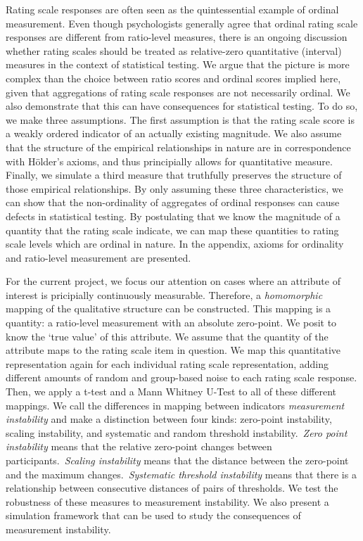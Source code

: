 \documentclass[utf8]{FrontiersinVancouver}
\begin{document}
Rating scale responses are often seen as the quintessential example of ordinal measurement. Even though psychologists generally agree that ordinal rating scale responses are different from ratio-level measures, there is an ongoing discussion whether rating scales should be treated as relative-zero quantitative (interval) measures in the context of statistical testing. We argue that the picture is more complex than the choice between ratio scores and ordinal scores implied here, given that aggregations of rating scale responses are not necessarily ordinal. We also demonstrate that this can have consequences for statistical testing. To do so, we make three assumptions. The first assumption is that the rating scale score is a weakly ordered indicator of an actually existing magnitude. We also assume that the structure of the empirical relationships in nature are in correspondence with Hölder's axioms, and thus principially allows for quantitative measure. Finally, we simulate a third measure that truthfully preserves the structure of those empirical relationships. By only assuming these three characteristics, we can show that the non-ordinality of aggregates of ordinal responses can cause defects in statistical testing. By postulating that we know the magnitude of a quantity that the rating scale indicate, we can map these quantities to rating scale levels which are ordinal in nature. In the appendix, axioms for ordinality and ratio-level measurement are presented. 

For the current project, we focus our attention on cases where an attribute of interest is pricipially continuously measurable. Therefore, a \textit{homomorphic} mapping of the qualitative structure can be constructed. This mapping is a quantity: a ratio-level measurement with an absolute zero-point. We posit to know the `true value' of this attribute. We assume that the quantity of the attribute maps to the rating scale item in question. We map this quantitative representation again for each individual rating scale representation, adding different amounts of random and group-based noise to each rating scale response. Then, we apply a t-test and a Mann Whitney U-Test to all of these different mappings. We call the differences in mapping between indicators \textit{measurement instability} and make a distinction between four kinds: zero-point instability, scaling instability, and systematic and random threshold instability.\ \textit{Zero point instability} means that the relative zero-point changes between participants.\ \textit{Scaling instability} means that the distance between the zero-point and the maximum changes.\ \textit{Systematic threshold instability} means that there is a relationship between consecutive distances of pairs of thresholds. We test the robustness of these measures to measurement instability. We also present a simulation framework that can be used to study the consequences of measurement instability.
\end{document}
